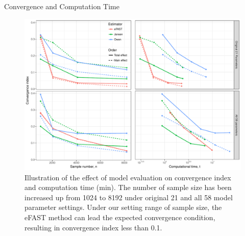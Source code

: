 \documentclass[xcolor=table]{beamer}
\begin{document}
\begin{frame}[t]
\begin{columns}[t]
\begin{column}{0.23\paperwidth}
\begin{block}{Convergence and Computation Time}
\begin{figure}
\includegraphics[width=0.98\linewidth]{fig2.pdf}
\caption{Illustration of the effect of model evaluation on convergence index and computation time (min).
The number of sample size has been increased up from 1024 to 8192 under original 21 and all 58 model parameter settings.
Under our setting range of sample size, the eFAST method can lead the expected convergence condition, resulting in convergence index less than 0.1.
}
\end{figure}
\end{block}



\end{column}
\end{columns}
\end{frame}
\end{document}
